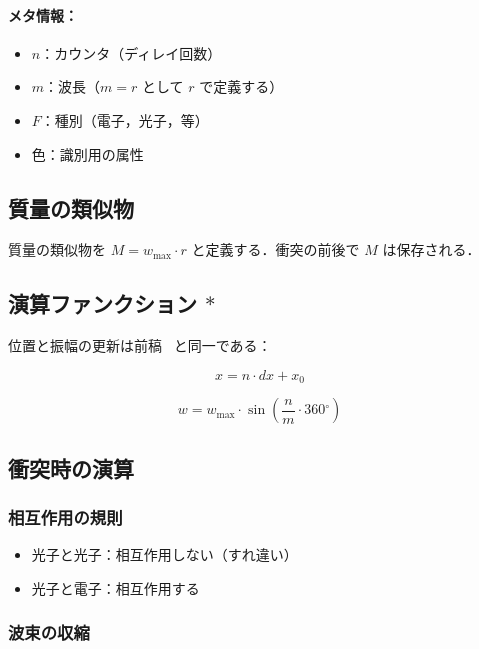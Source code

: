 \documentclass[12pt,a4paper]{ltjsarticle}
\begin{document}
\paragraph{メタ情報：}

\begin{itemize}
  \item $n$：カウンタ（ディレイ回数）
  \item $m$：波長（$m = r$ として $r$ で定義する）
  \item $F$：種別（電子，光子，等）
  \item 色：識別用の属性
\end{itemize}

\subsection{質量の類似物}

質量の類似物を $M = w_{\max} \cdot r$ と定義する．衝突の前後で $M$ は保存される．

\subsection{演算ファンクション $*$}

位置と振幅の更新は前稿~\cite{ref4} と同一である：

\begin{equation}
x = n \cdot dx + x_0
\end{equation}

\begin{equation}
w = w_{\max} \cdot \sin\!\left(\frac{n}{m} \cdot 360{}^\circ\right)
\end{equation}

\subsection{衝突時の演算}

\subsubsection*{相互作用の規則}

\begin{itemize}
  \item 光子と光子：相互作用しない（すれ違い）
  \item 光子と電子：相互作用する
\end{itemize}

\subsubsection*{波束の収縮}
\end{document}

